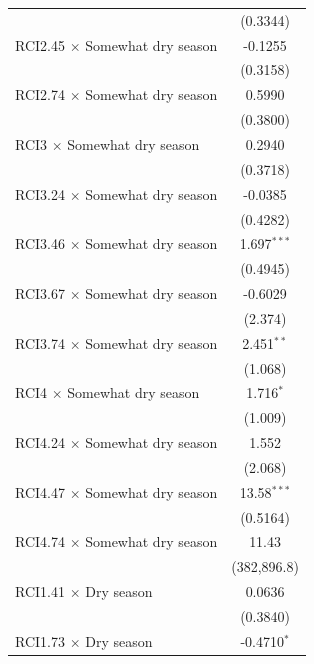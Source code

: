 \begin{table}[H]
\begin{tabular}{lc}
                                            & (0.3344)\\   
      RCI2.45 $\times$ Somewhat dry season  & -0.1255\\   
                                            & (0.3158)\\   
      RCI2.74 $\times$ Somewhat dry season  & 0.5990\\   
                                            & (0.3800)\\   
      RCI3 $\times$ Somewhat dry season     & 0.2940\\   
                                            & (0.3718)\\   
      RCI3.24 $\times$ Somewhat dry season  & -0.0385\\   
                                            & (0.4282)\\   
      RCI3.46 $\times$ Somewhat dry season  & 1.697$^{***}$\\   
                                            & (0.4945)\\   
      RCI3.67 $\times$ Somewhat dry season  & -0.6029\\   
                                            & (2.374)\\   
      RCI3.74 $\times$ Somewhat dry season  & 2.451$^{**}$\\   
                                            & (1.068)\\   
      RCI4 $\times$ Somewhat dry season     & 1.716$^{*}$\\   
                                            & (1.009)\\   
      RCI4.24 $\times$ Somewhat dry season  & 1.552\\   
                                            & (2.068)\\   
      RCI4.47 $\times$ Somewhat dry season  & 13.58$^{***}$\\   
                                            & (0.5164)\\   
      RCI4.74 $\times$ Somewhat dry season  & 11.43\\   
                                            & (382,896.8)\\   
      RCI1.41 $\times$ Dry season           & 0.0636\\   
                                            & (0.3840)\\   
      RCI1.73 $\times$ Dry season           & -0.4710$^{*}$\\   

\end{tabular}
\end{table}
